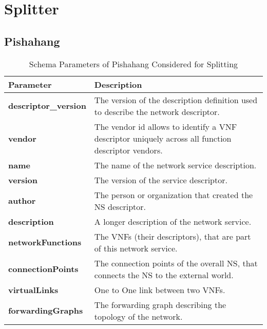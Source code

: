 \newpage
\section{Splitter}
\subsection{Pishahang}
\begin{table}[H]
	\begin{center}
		\caption{Schema Parameters of Pishahang Considered for Splitting}
		\label{tab:table1}
		\begin{tabular}{l|l} 
			\textbf{Parameter} & \textbf{Description} \\
			\hline
			\textbf{descriptor\_version} & The version of the description definition used to describe the network descriptor. \\ 
			\textbf{vendor } & The vendor id allows to identify a VNF descriptor uniquely across all function descriptor vendors.  \\
			\textbf{name} & The name of the network service description. \\
			\textbf{version} & The version of the service descriptor. \\
			\textbf{author} & The person or organization that created the NS descriptor. \\
			\textbf{description} & A longer description of the network service. \\
			\textbf{networkFunctions} & The VNFs (their descriptors), that are part of this network service. \\
			\textbf{connectionPoints} & The connection points of the overall NS, that connects the NS to the external world. \\
			\textbf{virtualLinks} & One to One link between two VNFs. \\
			\textbf{forwardingGraphs} & The forwarding graph describing the topology of the network. \\
		\end{tabular}
	\end{center}
\end{table}
